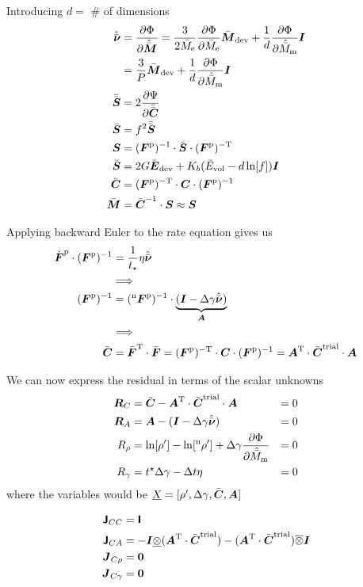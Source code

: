 \documentclass[a4paper,11pt]{article}
\newcommand{\ootimes}{\overline{\otimes}}
\newcommand{\uotimes}{\underline{\otimes}}
\newcommand{\tf}[1]{\text{\boldmath $\sf #1$}}
\newcommand{\ts}[1]{\text{\boldmath $#1$}}
\newcommand{\pderiv}[2]{\frac{\partial #1}{\partial #2}}
\newcommand{\dev}{{\rm dev}}
\newcommand{\vol}{{\rm vol}}
\newcommand{\trial}{{\rm trial}}
\newcommand{\rme}{{\rm e}}
\newcommand{\rmm}{{\rm m}}
\newcommand{\rmp}{{\rm p}}
\newcommand{\rmT}{{\rm T}}
\newcommand{\old}{{}^{\rm n}}
\begin{document}
Introducing $d = $ \# of dimensions
\begin{align*}
	\hat{\bar{\ts\nu}} &= \pderiv{\Phi}{\hat{\bar{\ts M}}} = 
		\frac{3}{2\bar M_\rme}\pderiv{\Phi}{\bar M_\rme}\bar{\ts M}_\dev+\frac1d\pderiv{\Phi}{\hat{\bar M}_\rmm} \ts I\\
			&= \frac{3}{P}\bar{\ts M}_\dev+\frac1d\pderiv{\Phi}{\hat{\bar M}_\rmm} \ts I\\
	\bar{\bar{\ts S}} &= 2\pderiv{\Psi}{\bar{\bar{\ts C}}}\\
	\bar{\ts S} &= f^2 \bar{\bar{\ts S}}\\
	\ts S &= (\ts F^\rmp)^{-1}\cdot\bar{\ts S}\cdot(\ts F^\rmp)^{-\rmT}\\
	\bar{\ts S} &= 2G \bar{\ts E}_\dev + K_b(\bar E_\vol -d\ln[f])\ts I\\
	\bar{\ts C} &= (\ts F^\rmp)^{-\rmT}\cdot\ts C\cdot(\ts F^\rmp)^{-1}\\
	\bar{\ts M} &= \bar{\ts C}^{-1}\cdot\ts S \approx \ts S
\end{align*}

Applying backward Euler to the rate equation gives us
\begin{align*}
	\dot{\ts F}^\rmp\cdot(\ts F^\rmp)^{-1} &= \frac{1}{t_\star}\eta\hat{\bar{\ts\nu}}\\
	&\Longrightarrow\\
	(\ts F^\rmp)^{-1} &= (\old\ts F^\rmp)^{-1}\cdot\underbrace{(\ts I - \Delta\gamma\hat{\bar{\ts\nu}})}_{\ts A}\\
	&\Longrightarrow\\
	\bar{\ts C} &= \bar{\ts F}^{\rmT}\cdot\bar{\ts F} 
				 = (\ts F^\rmp)^{-\rmT} \cdot\ts C\cdot(\ts F^\rmp)^{-1} 
				 = \ts A^\rmT\cdot \bar{\ts C}^\trial\cdot\ts A
\end{align*}

We can now express the residual in terms of the scalar unknowns
\begin{align*}
    \ts R_C &= \bar{\ts C} - \ts A^\rmT\cdot\bar{\ts C}^\trial\cdot\ts A &= 0\\
	\ts R_A &= \ts A - (\ts I - \Delta\gamma\hat{\bar{\ts\nu}}) &= 0\\
	R_\rho &= \ln[\rho']-\ln[\old\rho']+\Delta\gamma\pderiv{\Phi}{\hat{\bar M}_\rmm} &= 0\\
	R_\gamma &= t^\star \Delta\gamma - \Delta t \eta &= 0
\end{align*}
where the variables would be $\underline{X} = [\rho', \Delta\gamma, \bar{\ts C}, \ts A]$

\begin{align*}
	\tf J_{C C}      &= \tf I\\
	\tf J_{C A} &= -\ts I\uotimes(\ts A^\rmT\cdot\bar{\ts C}^\trial) - (\ts A^\rmT\cdot\bar{\ts C}^\trial)\ootimes\ts I\\
	\ts J_{C \rho}   &= \ts 0\\
	\ts J_{C \gamma} &= \ts 0
\end{align*}
\end{document}
